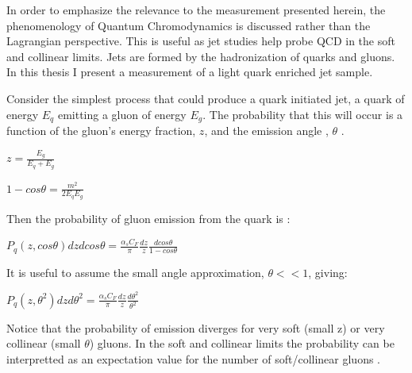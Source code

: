 







In order to emphasize the relevance to the measurement presented herein, the phenomenology of Quantum Chromodynamics is discussed rather than the Lagrangian perspective. This is useful as jet studies help probe QCD in the soft and collinear limits. 
Jets are formed by the hadronization of quarks and gluons. In this thesis I present a measurement of a light quark enriched jet sample. 



Consider the simplest process that could produce a quark initiated jet, a quark of energy $E_q$  emitting a gluon of energy $E_g$. The probability that this will occur is a function of the gluon's energy fraction, $z$, and the emission angle , $\theta$  \cite{Larkoski:2017fip}.\newline


$z = \frac{E_g}{E_q + E_g}$\newline

$1 - cos \theta = \frac{m^2}{2 E_q E_g}$\newline

Then the probability of gluon emission from the quark is :


$P_q(z,cos \theta) dz d cos \theta = \frac{\alpha_s C_F}{\pi}  \frac{dz}{z} \frac{dcos \theta}{1 - cos \theta}  $\newline

It is useful to assume the small angle approximation, $\theta << 1$, giving:\newline


$P_q(z,\theta^2) dz d \theta^2 = \frac{\alpha_s C_F}{\pi}  \frac{dz}{z} \frac{d \theta^2}{ \theta^2}  $\newline

Notice that the probability of emission diverges for very soft (small z) or very collinear (small $\theta$) gluons. In the soft and collinear limits the probability can be interpretted as an expectation value for the number of soft/collinear gluons \cite{Larkoski:2017fip}.

